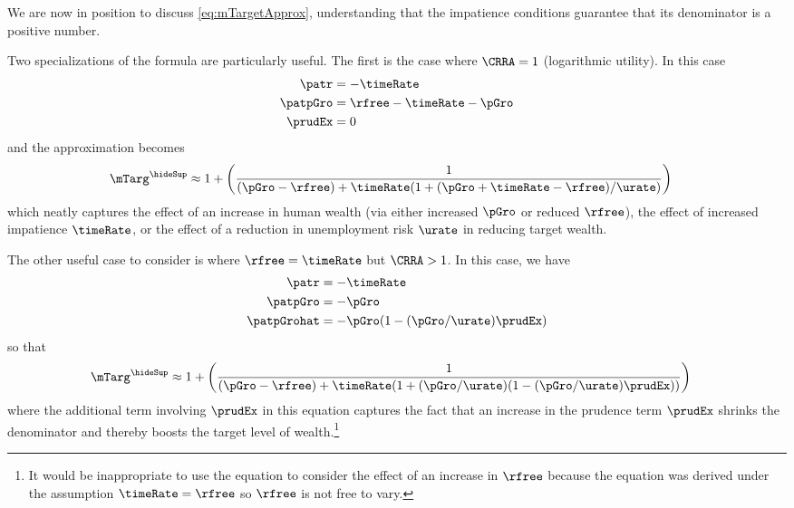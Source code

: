 \documentclass{\handout}
\begin{document}
We are now in position to discuss \eqref{eq:mTargetApprox}, understanding that the
impatience conditions guarantee that its denominator is a positive number.

Two specializations of the formula are particularly useful.  The first is
the case where $\CRRA = 1$ (logarithmic utility).  In this case
\begin{equation}\begin{gathered}\begin{aligned}
    \patr & =  -\timeRate
\\  \patpGro & =  \rfree-\timeRate-\pGro
\\  \prudEx & =  0
\end{aligned}\end{gathered}\end{equation}
and the approximation becomes
\begin{equation}\begin{gathered}\begin{aligned}
 \mTarg^{\hideSup} & \approx  1 + \left(\frac{1}{(\pGro-\rfree)+\timeRate(1+(\pGro+\timeRate-\rfree)/\urate)}\right)
\end{aligned}\end{gathered}\end{equation}
which neatly captures the effect of an increase in human wealth (via either increased $\pGro$ or reduced $\rfree$), the effect of increased impatience $\timeRate$,
or the effect of a reduction in unemployment risk $\urate$ in reducing target wealth.


The other useful case to consider is where $\rfree = \timeRate$ but $\CRRA>1$.  In this case, we have
\begin{equation}\begin{gathered}\begin{aligned}
    \patr & =  -\timeRate
\\  \patpGro & =  -\pGro
\\  \patpGrohat & =  -\pGro (1-(\pGro/\urate)\prudEx)
\end{aligned}\end{gathered}\end{equation}
so that
\begin{equation}\begin{gathered}\begin{aligned}
 \mTarg^{\hideSup} & \approx  1 + \left(\frac{1}{(\pGro-\rfree)+\timeRate(1+(\pGro/\urate)(1-(\pGro/\urate)\prudEx))}\right)
\end{aligned}\end{gathered}\end{equation}
where the additional term involving $\prudEx$ in this equation
captures the fact that an increase in the prudence term $\prudEx$
shrinks the denominator and thereby boosts the target level of
wealth.\footnote{It would be inappropriate to use the equation to
  consider the effect of an increase in $\rfree$ because the equation was derived under the
  assumption $\timeRate=\rfree$ so $\rfree$ is not free to vary.}
\end{document}
